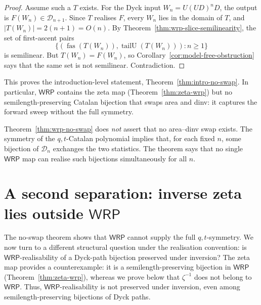 \documentclass[11pt]{article}
\theoremstyle{definition}
\newcommand{\D}{\mathcal D}
\newcommand{\WRP}{\mathsf{WRP}}
\newcommand{\fas}{\operatorname{fas}}
\newcommand{\tailU}{\operatorname{tailU}}
\begin{document}
\begin{proof}
Assume such a $T$ exists.  For the Dyck input $W_n=U(UD)^nD$, the output
is $F(W_n)\in\D_{n+1}$.  Since $T$ realises $F$, every $W_n$ lies in the
domain of $T$, and $|T(W_n)|=2(n+1)=O(n)$.  By
Theorem~\ref{thm:wrp-slice-semilinearity}, the set of first-ascent pairs
\[
   \{(\fas(T(W_n)),\tailU(T(W_n))):n\ge 1\}
\]
is semilinear.  But $T(W_n)=F(W_n)$, so
Corollary~\ref{cor:model-free-obstruction} says that the same set is not
semilinear.  Contradiction.
\end{proof}

This proves the introduction-level statement, Theorem~\ref{thm:intro-no-swap}.
In particular, $\WRP$ contains the zeta map (Theorem~\ref{thm:zeta-wrp}) but no
semilength-preserving Catalan bijection that swaps area and dinv: it captures the
forward sweep without the full symmetry.

Theorem~\ref{thm:wrp-no-swap} does \emph{not} assert that no area--dinv
swap exists.  The symmetry of the $q,t$-Catalan polynomial implies that, for
each fixed $n$, some bijection of $\D_n$ exchanges the two statistics.  The
theorem says that no single $\WRP$ map can realise such bijections
simultaneously for all $n$.

\section[Inverse zeta lies outside WRP]
{A second separation: inverse zeta lies outside $\WRP$}
\label{sec:inverse-zeta}

The no-swap theorem shows that $\WRP$ cannot supply the full
$q,t$-symmetry.  We now turn to a different structural question under the
realisation convention: is $\WRP$-realisability of a Dyck-path bijection
preserved under inversion?  The zeta map provides a counterexample: it is a
semilength-preserving bijection in $\WRP$ (Theorem~\ref{thm:zeta-wrp}), whereas we
prove below that $\zeta^{-1}$ does not belong to $\WRP$.  Thus,
$\WRP$-realisability is not preserved under inversion, even among
semilength-preserving bijections of Dyck paths.
\end{document}
